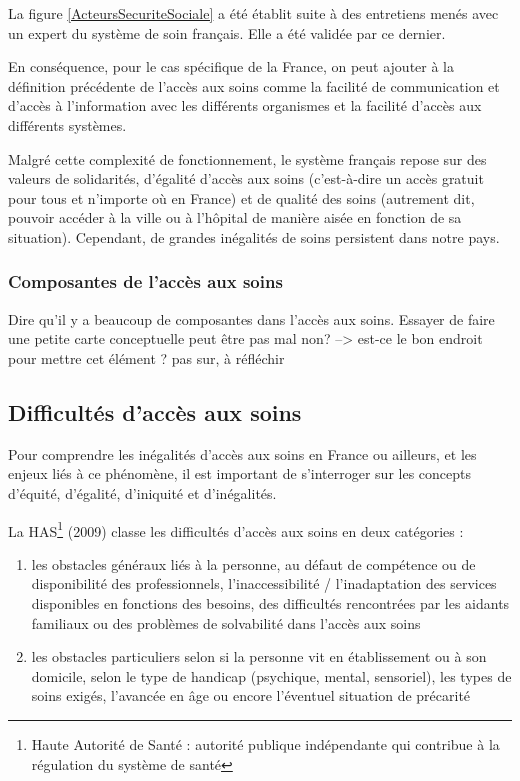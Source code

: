 La figure \ref{ActeursSecuriteSociale} a été établit suite à des entretiens menés avec un expert du système de soin français. Elle a été validée par ce dernier.

En conséquence, pour le cas spécifique de la France, on peut ajouter à la définition précédente de l'accès aux soins comme la facilité de communication et d'accès à l'information avec les différents organismes et la facilité d'accès aux différents systèmes.

Malgré cette complexité de fonctionnement, le système français repose sur des valeurs de solidarités, d'égalité d'accès aux soins (c'est-à-dire un accès gratuit pour tous et n'importe où en France) et de qualité des soins (autrement dit, pouvoir accéder à la ville ou à l'hôpital de manière aisée en fonction de sa situation). Cependant, de grandes inégalités de soins persistent dans notre pays.


\subsubsection{Composantes de l'accès aux soins}

Dire qu'il y a beaucoup de composantes dans l'accès aux soins. Essayer de faire une petite carte conceptuelle peut être pas mal non? 
--> est-ce le bon endroit pour mettre cet élément ? pas sur, à réfléchir

\subsection{Difficultés d'accès aux soins}
Pour comprendre les inégalités d'accès aux soins en France ou ailleurs, et les enjeux liés à ce phénomène, il est important de s'interroger sur les concepts d'équité, d'égalité, d'iniquité et d'inégalités.

La HAS\footnote{Haute Autorité de Santé : autorité publique indépendante qui contribue à la régulation du système de santé } (2009) \cite{HAS2009} classe les difficultés d'accès aux soins en deux catégories : 
\begin{enumerate}
\item les obstacles généraux liés à la personne, au défaut de compétence ou de disponibilité des professionnels, l'inaccessibilité / l'inadaptation des services disponibles en fonctions des besoins, des difficultés rencontrées par les aidants familiaux ou des problèmes de solvabilité dans l'accès aux soins
\item les obstacles particuliers selon si la personne vit en établissement ou à son domicile, selon le type de handicap (psychique, mental, sensoriel), les types de soins exigés, l'avancée en âge ou encore l'éventuel situation de précarité
\end{enumerate}

